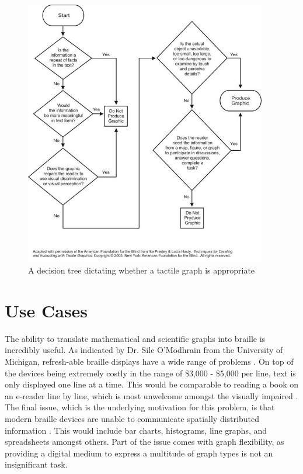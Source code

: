 \begin{figure}[hbt]
    \centering
    \includegraphics[width=300pt,keepaspectratio]{figures/body/motivation/decisiontree.jpg}
    \caption{A decision tree dictating whether a tactile graph is appropriate \cite{tactile_graphics}}
    \label{figure:decision_tree}
\end{figure}


\section{Use Cases}
The ability to translate mathematical and scientific graphs into braille is incredibly useful. As indicated by Dr. Sile O'Modhrain from the University of Michigan, refresh-able braille displays have a wide range of problems \cite{youtube_2015}. On top of the devices being extremely costly in the range of \$3,000 - \$5,000 per line, text is only displayed one line at a time. This would be comparable to reading a book on an e-reader line by line, which is most unwelcome amongst the visually impaired \cite{youtube_2015}. The final issue, which is the underlying motivation for this problem, is that modern braille devices are unable to communicate spatially distributed information \cite{youtube_2015}. This would include bar charts, histograms, line graphs, and spreadsheets amongst others. Part of the issue comes with graph flexibility, as providing a digital medium to express a multitude of graph types is not an insignificant task.

